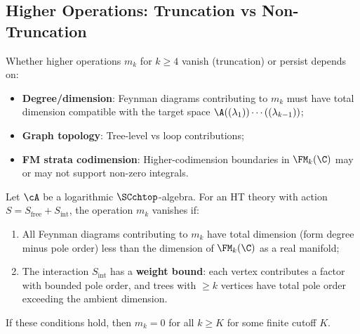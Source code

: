 
\subsection{Higher Operations: Truncation vs Non-Truncation}
\label{sec:truncation_LG}

Whether higher operations $m_k$ for $k \geq 4$ vanish (truncation) or persist depends on:
\begin{itemize}
\item \textbf{Degree/dimension}: Feynman diagrams contributing to $m_k$ must have total dimension compatible with the target space $\A((\lambda_1)) \cdots ((\lambda_{k-1}))$;
\item \textbf{Graph topology}: Tree-level vs loop contributions;
\item \textbf{FM strata codimension}: Higher-codimension boundaries in $\FM_k(\C)$ may or may not support non-zero integrals.
\end{itemize}

\begin{proposition}
\label{prop:truncation_criterion}
Let\/ $\cA$ be a logarithmic\/ $\SCchtop$-algebra.
For an HT theory with action $S = S_{\text{free}} + S_{\text{int}}$, the operation $m_k$ vanishes if:
\begin{enumerate}[label=(\roman*)]
\item All Feynman diagrams contributing to $m_k$ have total dimension (form degree minus pole order) less than the dimension of $\FM_k(\C)$ as a real manifold;

\item The interaction $S_{\text{int}}$ has a \textbf{weight bound}: each vertex contributes a factor with bounded pole order, and trees with $\geq k$ vertices have total pole order exceeding the ambient dimension.
\end{enumerate}

If these conditions hold, then $m_k = 0$ for all $k \geq K$ for some finite cutoff $K$.
\end{proposition}

